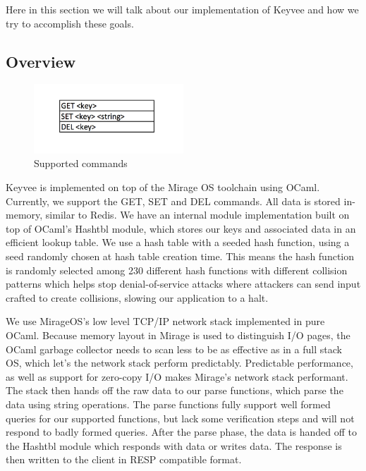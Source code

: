 \documentclass[english,10pt,twocolumn]{article}
\begin{document}
Here in this section we will talk about our implementation of Keyvee and how we try to accomplish these goals.

\subsection{Overview}



\begin{figure}[ht]
  \centering
  \caption{Supported commands}
  \includegraphics[width=0.5\textwidth]{images/commands}
\end{figure}

Keyvee is implemented on top of the Mirage OS toolchain using OCaml. Currently, we support the GET, SET and DEL commands. All data is stored in-memory, similar to Redis. We have an internal module implementation built on top of OCaml's Hashtbl module, which stores our keys and associated data in an efficient lookup table. We use a hash table with a seeded hash function, using a seed randomly chosen at hash table creation time. This means the hash function is randomly selected among 230 different hash functions with different collision patterns which helps stop denial-of-service attacks where attackers can send input crafted to create collisions, slowing our application to a halt.

We use MirageOS's low level TCP/IP network stack implemented in pure OCaml. Because memory layout in Mirage is used to distinguish I/O pages, the OCaml garbage collector needs to scan less to be as effective as in a full stack OS, which let's the network stack perform predictably. Predictable performance, as well as support for zero-copy I/O makes Mirage's network stack performant. The stack then hands off the raw data to our parse functions, which parse the data using string operations. The parse functions fully support well formed queries for our supported functions, but lack some verification steps and will not respond to badly formed queries. After the parse phase, the data is handed off to the Hashtbl module which responds with data or writes data. The response is then written to the client in RESP compatible format.
\end{document}

